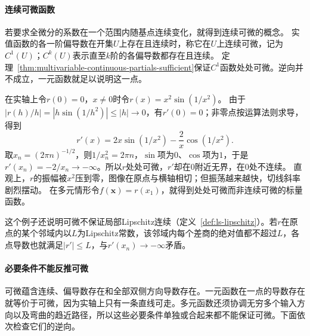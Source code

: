 \paragraph{连续可微函数}
若要求全微分的系数在一个范围内随基点连续变化，就得到连续可微的概念。
实值函数的各一阶偏导数在开集$U$上存在且连续时，称它在$U$上连续可微，记为$C^1(U)$；$C^k(U)$表示直至$k$阶的各偏导数都存在且连续。
定理~\ref{thm:multivariable-continuous-partials-sufficient}保证$C^1$函数处处可微。逆向并不成立，一元函数就足以说明这一点。
\begin{example}[处处可微而导数无界]
\label{ex:multivariable-differentiable-not-c1}
在实轴上令$r(0)=0$，$x\neq0$时令$r(x)=x^2\sin(1/x^2)$。
由于$|r(h)/h|=|h\sin(1/h^2)|\leq|h|\to0$，有$r'(0)=0$；非零点按运算法则求导，得到
\[
 r'(x)=2x\sin(1/x^2)-\frac{2}{x}\cos(1/x^2).
\]
取$x_n=(2\pi n)^{-1/2}$，则$1/x_n^2=2\pi n$，$\sin$项为$0$、$\cos$项为$1$，于是$r'(x_n)=-2/x_n\to-\infty$。所以$r$处处可微，$r'$却在$0$附近无界，在$0$处不连续。
直观上，$r$的振幅被$x^2$压到零，图像在原点与横轴相切；但振荡越来越快，切线斜率剧烈摆动。
在多元情形令$f(\bm x)=r(x_1)$，就得到处处可微而非连续可微的标量函数。
\end{example}

这个例子还说明可微不保证局部Lipschitz连续（定义~\ref{def:ls-lipschitz}）。若$r$在原点的某个邻域内以$L$为Lipschitz常数，该邻域内每个差商的绝对值都不超过$L$，各点导数也就满足$|r'|\leq L$，与$r'(x_n)\to-\infty$矛盾。

\paragraph{必要条件不能反推可微}
可微蕴含连续、偏导数存在和全部双侧方向导数存在。一元函数在一点的导数存在就等价于可微，因为实轴上只有一条直线可走。多元函数还须协调无穷多个输入方向以及弯曲的趋近路径，所以这些必要条件单独或合起来都不能保证可微。下面依次检查它们的逆向。

